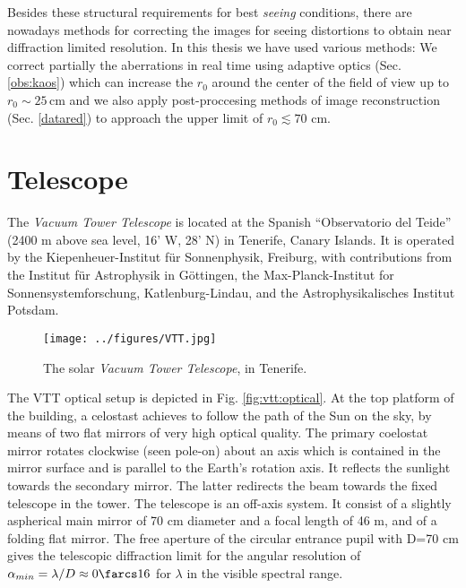 Besides these structural requirements for best \emph{seeing} conditions, there are nowadays methods for correcting the images for seeing distortions to obtain near diffraction limited resolution. In this thesis we have used various methods: We correct partially the aberrations in real time using adaptive optics (Sec. \ref{obs:kaos}) which can increase the $r_{0}$ around the center of the field of view up to $r_{0}\sim 25$\,cm and we also apply post-proccesing methods of image reconstruction (Sec. \ref{datared}) to approach the upper limit of $r_{0} \lesssim 70$ cm.


\newpage
\section{Telescope\label{sec:telescope}}
The \emph{Vacuum Tower Telescope} \citep[VTT,][ Fig. \ref{fig:foto:vtt}]{1985spit.conf.1191S} is located at the Spanish ``Observatorio del Teide'' (2400 m above sea level, 16' W, 28' N) in Tenerife, Canary Islands. It is operated by the Kiepenheuer-Institut f\"ur Sonnenphysik, Freiburg, with contributions from the Institut f\"ur Astrophysik in G\"ottingen, the Max-Planck-Institut for Sonnensystemforschung, Katlenburg-Lindau,  and the Astrophysikalisches Institut Potsdam.


\begin{wrapfigure}[19]{r}{0.4\textwidth}
\vspace{-0.4cm}
\begin{center}
\texttt{[image: ../figures/VTT.jpg]}
\caption{The solar \emph{Vacuum Tower Telescope}, in Tenerife.}
\label{fig:foto:vtt}
\end{center}
\end{wrapfigure}

The VTT optical setup is depicted in Fig. \ref{fig:vtt:optical}. At the top platform of the building, a celostast achieves to follow the path of the Sun on the sky, by means of two flat mirrors of very high optical quality. The primary coelostat mirror rotates clockwise (seen pole-on) about an axis which is contained in the mirror surface and is parallel to the Earth's rotation axis. It reflects the sunlight towards the secondary mirror. The latter redirects the beam towards the fixed telescope in the tower. The telescope is an off-axis system. It consist of a slightly aspherical main mirror of 70 cm diameter and a focal length of 46 m, and of a folding flat mirror. The free aperture of the circular entrance pupil with D=70 cm gives the telescopic diffraction limit for the  angular resolution of $\alpha_{min}=\lambda/D \approx0\farcs16$ for $\lambda$ in the visible spectral range. 

